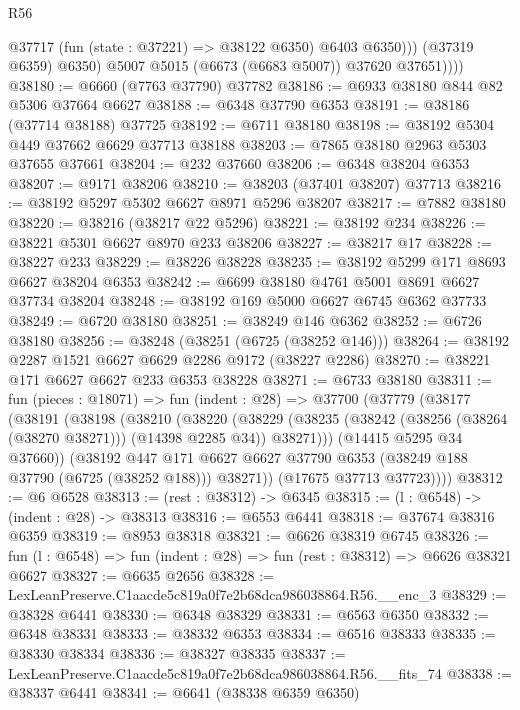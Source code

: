 \begin{lexlean}{R56}
\begin{coremodule}
                  @37717 (fun (state : @37221) => @38122 @6350) @6403 @6350)))
              (@37319 @6359)
              @6350)
            @5007
            @5015
            (@6673 (@6683 @5007))
            @37620
            @37651))))
@38180 := @6660 (@7763 @37790) @37782
@38186 := @6933 @38180 @844 @82 @5306 @37664 @6627
@38188 := @6348 @37790 @6353
@38191 := @38186 (@37714 @38188) @37725
@38192 := @6711 @38180
@38198 := @38192 @5304 @449 @37662 @6629 @37713 @38188
@38203 := @7865 @38180 @2963 @5303 @37655 @37661
@38204 := @232 @37660
@38206 := @6348 @38204 @6353
@38207 := @9171 @38206
@38210 := @38203 (@37401 @38207) @37713
@38216 := @38192 @5297 @5302 @6627 @8971 @5296 @38207
@38217 := @7882 @38180
@38220 := @38216 (@38217 @22 @5296)
@38221 := @38192 @234
@38226 := @38221 @5301 @6627 @8970 @233 @38206
@38227 := @38217 @17
@38228 := @38227 @233
@38229 := @38226 @38228
@38235 := @38192 @5299 @171 @8693 @6627 @38204 @6353
@38242 := @6699 @38180 @4761 @5001 @8691 @6627 @37734 @38204
@38248 := @38192 @169 @5000 @6627 @6745 @6362 @37733
@38249 := @6720 @38180
@38251 := @38249 @146 @6362
@38252 := @6726 @38180
@38256 := @38248 (@38251 (@6725 (@38252 @146)))
@38264 := @38192 @2287 @1521 @6627 @6629 @2286 @9172 (@38227 @2286)
@38270 := @38221 @171 @6627 @6627 @233 @6353 @38228
@38271 := @6733 @38180
@38311 := fun (pieces : @18071) =>
  fun (indent : @28) =>
  @37700
    (@37779
      (@38177
        (@38191
          (@38198
            (@38210
              (@38220
                (@38229
                  (@38235 (@38242 (@38256 (@38264 (@38270 @38271))) (@14398 @2285 @34)) @38271)))
              (@14415 @5295 @34 @37660))
            (@38192
              @447
              @171
              @6627
              @6627
              @37790
              @6353
              (@38249 @188 @37790 (@6725 (@38252 @188)))
              @38271))
          (@17675 @37713 @37723))))
@38312 := @6 @6528
@38313 := (rest : @38312) -> @6345
@38315 := (l : @6548) -> (indent : @28) -> @38313
@38316 := @6553 @6441
@38318 := @37674 @38316 @6359
@38319 := @8953 @38318
@38321 := @6626 @38319 @6745
@38326 := fun (l : @6548) => fun (indent : @28) => fun (rest : @38312) => @6626 @38321 @6627
@38327 := @6635 @2656
@38328 := LexLeanPreserve.C1aacde5c819a0f7e2b68dca986038864.R56.__enc_3
@38329 := @38328 @6441
@38330 := @6348 @38329
@38331 := @6563 @6350
@38332 := @6348 @38331
@38333 := @38332 @6353
@38334 := @6516 @38333
@38335 := @38330 @38334
@38336 := @38327 @38335
@38337 := LexLeanPreserve.C1aacde5c819a0f7e2b68dca986038864.R56.__fits_74
@38338 := @38337 @6441
@38341 := @6641 (@38338 @6359 @6350)

\end{coremodule}
\end{lexlean}

